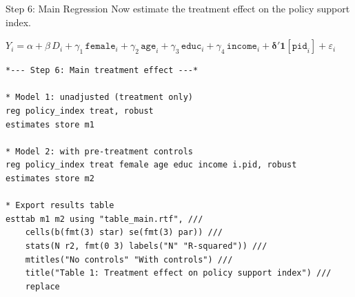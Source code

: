 \documentclass[aspectratio=169, 11pt]{beamer}
\begin{document}

\begin{frame}[fragile, t]{Step 6: Main Regression}
Now estimate the treatment effect on the policy support index.
\vspace{0.2em}
\begin{keybox}[Specification]
$Y_i = \alpha + \beta\,D_i + \gamma_1\,\texttt{female}_i + \gamma_2\,\texttt{age}_i + \gamma_3\,\texttt{educ}_i + \gamma_4\,\texttt{income}_i + \boldsymbol{\delta}'\mathbf{1}[\texttt{pid}_i] + \varepsilon_i$
\end{keybox}
\vspace{0.3em}
\begin{footnotesize}
\begin{verbatim}
*--- Step 6: Main treatment effect ---*

* Model 1: unadjusted (treatment only)
reg policy_index treat, robust
estimates store m1

* Model 2: with pre-treatment controls
reg policy_index treat female age educ income i.pid, robust
estimates store m2

* Export results table
esttab m1 m2 using "table_main.rtf", ///
    cells(b(fmt(3) star) se(fmt(3) par)) ///
    stats(N r2, fmt(0 3) labels("N" "R-squared")) ///
    mtitles("No controls" "With controls") ///
    title("Table 1: Treatment effect on policy support index") ///
    replace
\end{verbatim}
\end{footnotesize}
\end{frame}

\end{document}
